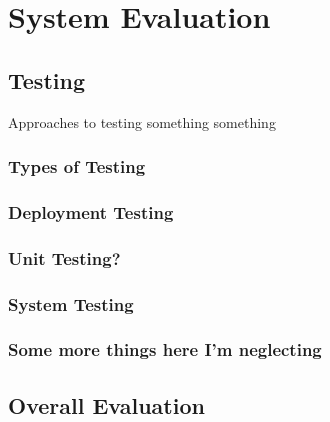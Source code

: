 \chapter{System Evaluation}

\section{Testing}
Approaches to testing something something
\subsection{Types of Testing}
\subsection{Deployment Testing}
\subsection{Unit Testing?}
\subsection{System Testing}

\subsection{Some more things here I'm neglecting}

\section{Overall Evaluation}
